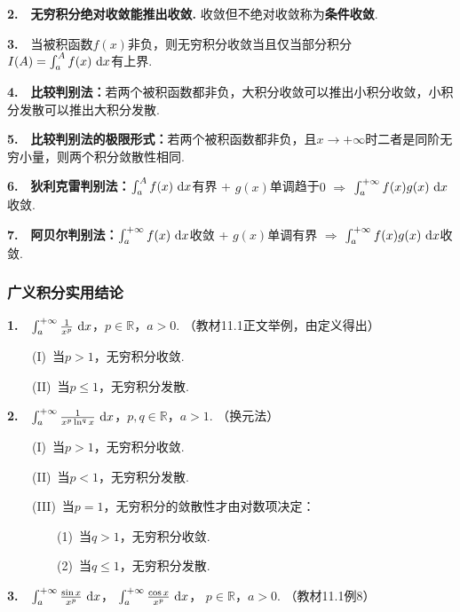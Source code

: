 \textbf{2.}~~\textbf{无穷积分绝对收敛能推出收敛.} 收敛但不绝对收敛称为\textbf{条件收敛}.\vspace{0.5em}


\textbf{3.}~~当被积函数$f(x)$非负，则无穷积分收敛当且仅当部分积分$I(A) = \int_{a}^{A} f(x)~\mathrm{d} x$有上界.\vspace{0.5em}

\textbf{4.}~~\textbf{比较判别法：}若两个被积函数都非负，大积分收敛可以推出小积分收敛，小积分发散可以推出大积分发散.\vspace{0.5em}

\textbf{5.}~~\textbf{比较判别法的极限形式：}若两个被积函数都非负，且$x \to +\infty$时二者是同阶无穷小量，则两个积分敛散性相同.\vspace{0.5em}

\textbf{6.}~~\textbf{狄利克雷判别法：}$\int_{a}^{A} f(x)~\mathrm{d} x$有界 + $g(x)$单调趋于$0$ $\Rightarrow$ $\int_{a}^{+\infty} f(x)g(x) ~\mathrm{d} x $收敛. \vspace{0.5em}

\textbf{7.}~~\textbf{阿贝尔判别法：}$\int_{a}^{+\infty} f(x)~\mathrm{d} x$收敛 + $g(x)$单调有界 $\Rightarrow$ $\int_{a}^{+\infty} f(x)g(x) ~\mathrm{d} x $收敛.

\subsubsection{广义积分实用结论}

\textbf{1.}~~$\int_{a}^{+\infty} \frac{1}{x^{p}}~\mathrm{d} x$，$p \in \mathbb{R}$，$a>0$. （教材11.1正文举例，由定义得出）\vspace{0.5em}

~~~~(I)~当$p>1$，无穷积分收敛.

~~~~(II)~当$p \le 1$，无穷积分发散. \vspace{1em}

\textbf{2.}~~$\int_{a}^{+\infty} \frac{1}{x^{p} \ln^q x }~\mathrm{d} x$，$p,q \in \mathbb{R}$，$a>1$. （换元法） \vspace{0.5em}

~~~~(I)~当$p>1$，无穷积分收敛.

~~~~(II)~当$p<1$，无穷积分发散.

~~~~(III)~当$p=1$，无穷积分的敛散性才由对数项决定：

~~~~~~~~(1)~当$q > 1$，无穷积分收敛.

~~~~~~~~(2)~当$q \le 1$，无穷积分发散. \vspace{1em}

\textbf{3.}~~$\int_{a}^{+\infty} \frac{\sin x}{x^p} ~\mathrm{d} x$，
$\int_{a}^{+\infty} \frac{\cos x}{x^p} ~\mathrm{d} x$，
$p \in \mathbb{R}$，$a>0$. （教材11.1例8） \vspace{0.5em}

